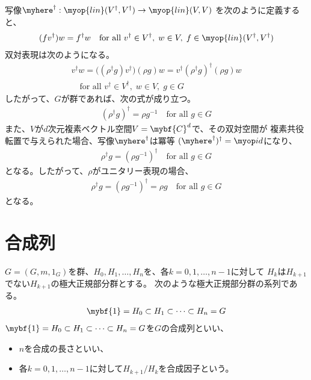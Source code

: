 	写像$\myhere^\dag:\myop{lin}(V^\dag,V^\dag)\to \myop{lin}(V,V)$
	を次のように定義すると、
	\begin{equation*}\begin{split} %
		(fv^\dag)w = f^\dag w
		\quad\text{for all }v^\dag \in V^\dag,\;w\in V,\; f\in \myop{lin}(V^\dag,V^\dag)
	\end{split}\end{equation*} %
	双対表現は次のようになる。
	\begin{equation*}\begin{split} %
		v^\dag w = \bigl((\rho^\dag g)v^\dag\bigr)(\rho g)w
		= v^\dag(\rho^\dag g)^\dag(\rho g)w \\
		\quad\text{for all }v^\dag \in V^\dag,\;w\in V,\; g\in G
	\end{split}\end{equation*} %
	したがって、$G$が群であれば、次の式が成り立つ。
	\begin{equation*}\begin{split} %
		(\rho^\dag g)^\dag = \rho g^{-1}
		\quad\text{for all }g\in G
	\end{split}\end{equation*} %
	また、$V$が$d$次元複素ベクトル空間$V=\mybf{C}^d$で、その双対空間が
	複素共役転置で与えられた場合、写像$\myhere^\dag$は冪等
	$(\myhere^\dag)^\dag=\myid$になり、
	\begin{equation*}\begin{split} %
		\rho^\dag g = (\rho g^{-1})^\dag
		\quad\text{for all }g\in G
	\end{split}\end{equation*} %
	となる。したがって、$\rho$がユニタリー表現の場合、
	\begin{equation*}\begin{split} %
		\rho^\dag g = (\rho g^{-1})^\dag = \rho g
		\quad\text{for all }g\in G
	\end{split}\end{equation*} %
	となる。

\section{合成列}\label{s1:合成列} %
	$G=(G,m,1_G)$を群、$H_0,H_1,\dots,H_n$を、各$k=0,1,\dots,n-1$に対して
	$H_k$は$H_{k+1}$でない$H_{k+1}$の極大正規部分群とする。
	次のような極大正規部分群の系列である。
	\begin{equation*}\begin{split} %
		\mybf{1}= H_0\subset H_1\subset \cdots\subset H_n=G
	\end{split}\end{equation*} %
	$\mybf{1}=H_0\subset H_1\subset\cdots\subset H_n=G$を$G$の合成列といい、
	\begin{itemize}\setlength{\itemsep}{-1mm} %
		\item $n$を合成の長さといい、
		\item 各$k=0,1,\dots,n-1$に対して$H_{k+1}/H_k$を合成因子という。
	\end{itemize} %

